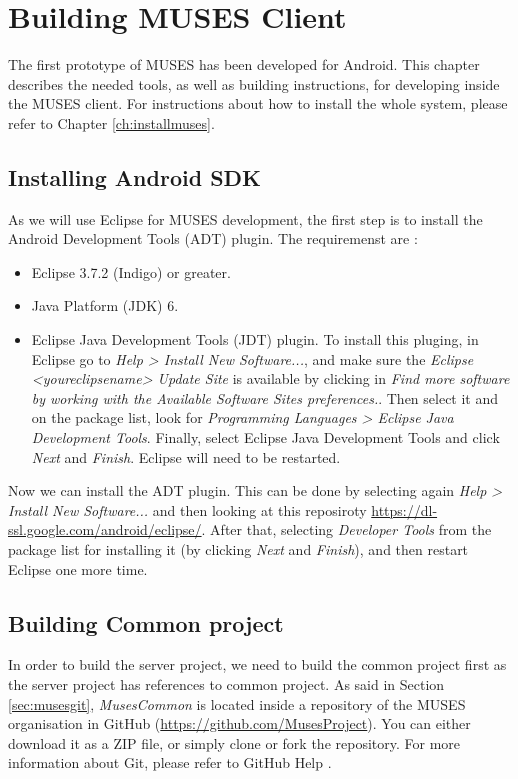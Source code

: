 \documentclass[a4paper,11pt]{book}
\begin{document}
\chapter{Building MUSES Client}
\label{ch:client}

The first prototype of MUSES has been developed for Android. This chapter describes the needed tools, as well as building instructions, for developing inside the MUSES client. For instructions about how to install the whole system, please refer to Chapter \ref{ch:installmuses}.

\section{Installing Android SDK}
\label{sec:ADT}

As we will use Eclipse for MUSES development, the first step is to install the Android Development Tools (ADT) plugin. The requiremenst are \cite{adt:site}:

\begin{itemize}
  \item Eclipse 3.7.2 (Indigo) or greater.
  \item Java Platform (JDK) 6.
  \item Eclipse Java Development Tools (JDT) plugin. To install this pluging, in Eclipse go to \textit{Help > Install New Software...}, and make sure the \textit{Eclipse <youreclipsename> Update Site} is available by clicking in \textit{Find more software by working with the Available Software Sites preferences.}. Then select it and on the package list, look for \textit{Programming Languages > Eclipse Java Development Tools}. Finally, select Eclipse Java Development Tools and click \textit{Next} and \textit{Finish}. Eclipse will need to be restarted.
\end{itemize}

Now we can install the ADT plugin. This can be done by selecting again \textit{Help > Install New Software...} and then looking at this reposiroty \url{https://dl-ssl.google.com/android/eclipse/}. After that, selecting \textit{Developer Tools} from the package list for installing it (by clicking \textit{Next} and \textit{Finish}), and then restart Eclipse one more time.

\section{Building Common project}
\label{sec:common}

In order to build the server project, we need to build the common project first as the server project has references to common project. As said in Section \ref{sec:musesgit}, \textit{MusesCommon} is located inside a repository of the MUSES organisation in GitHub (\url{https://github.com/MusesProject}). You can either download it as a ZIP file, or simply clone or fork the repository. For more information about Git, please refer to GitHub Help \cite{githelp:site}.
\end{document}
